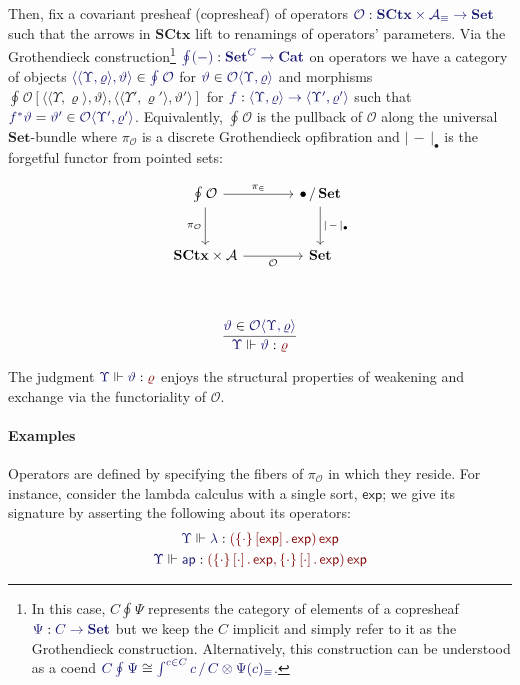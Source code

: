 \documentclass[11pt]{article}
\theoremstyle{definition}
\theoremstyle{remark}
\numberwithin{equation}{section}
\def\IModeColorName{MidnightBlue}
\def\OModeColorName{Maroon}
\newcommand\IMode[1]{{\color{\IModeColorName}{#1}}}
\newcommand\OMode[1]{{\color{\OModeColorName}{#1}}}
\newcommand\Member[2]{\IMode{#1}\in\IMode{#2}}
\newcommand\EqMember[3]{\IMode{#1}=\IMode{#2}\in\IMode{#3}}
\newcommand\Of[2]{\IMode{#1} : \IMode{#2}}
\newcommand\MkValence[3]{\left\{#1\right\}\left[#2\right].\, #3}
\newcommand\MkArity[2]{\left(#1\right) #2}
\newcommand\Arities{\mathcal{A}}
\newcommand\Operators{\mathcal{O}}
\newcommand\Cats{\mathbf{Cat}}
\newcommand\Discrete[1]{#1_{\equiv}}
\newcommand\Sets{\mathbf{Set}}
\newcommand\SCtx{\mathbf{SCtx}}
\newcommand\IsOperator[3]{\IMode{#1}\Vdash \IMode{#2} : \OMode{#3}}
\newcommand\Grothendieck[2]{\oint^{#1} #2#1}
\newcommand\Pair[2]{\langle #1, #2 \rangle}
\newcommand\Restriction[1]{#1^{*}}
\newcommand\Singleton{\bullet}
\newcommand\Forget[1]{|\, #1\, |}
\newcommand\Coslice[2]{#1\, /\, #2}
\newcommand\SortExp{\mathsf{exp}}
\newcommand\Hom[3]{#1\left[#2,#3\right]}
\begin{document}
Then, fix a covariant presheaf (copresheaf) of operators
$\Of{\Operators}{\SCtx\times\Discrete{\Arities}\to\Sets}$ such that the arrows
in $\SCtx$ lift to renamings of operators' parameters. Via the Grothendieck
construction\footnote{In this case, $C\Grothendieck{}{\Psi}$ represents the
  category of elements of a copresheaf $\Of{\Psi}{C\to\Sets}$ but we keep the
  $C$ implicit and simply refer to it as the Grothendieck construction.
  Alternatively, this construction can be understood as a coend
$\IMode{C\Grothendieck{}{\Psi}}\cong \IMode{\int^{c \in C}\Coslice{c}{C}
\otimes \Discrete{\Psi(c)}}$.} $\Of{\Grothendieck{}{(-)}}{\Sets^{C}\to\Cats}$
on operators we have a category of objects
$\Member{\Pair{\Pair{\Upsilon}{\varrho}}{\vartheta}}{\Grothendieck{}{\Operators}}$
for $\Member{\vartheta}{\Operators\Pair{\Upsilon}{\varrho}}$ and morphisms
$\Hom{\Grothendieck{}{\Operators}}{\Pair{\Pair{\Upsilon}{\varrho}}{\vartheta}}{\Pair{\Pair{\Upsilon'}{\varrho'}}{\vartheta'}}$
for $\Of{f}{\Pair{\Upsilon}{\varrho}\to\Pair{\Upsilon'}{\varrho'}}$ such that
$\EqMember{\Restriction{f}\vartheta}{\vartheta'}{\Operators\Pair{\Upsilon'}{\varrho'}}$.
Equivalently, $\Grothendieck{}{\Operators}$ is the pullback of $\Operators$
along the universal $\Sets$-bundle where $\pi_{\Operators}$ is a discrete
Grothendieck opfibration and $\Forget{-}_{\Singleton}$ is the forgetful functor
from pointed sets:

\[
\begin{tikzcd}[ampersand replacement = \&, sep = large]
  {\Grothendieck{}{\Operators}}
    \arrow[r, "{\pi_{\in}}"]
    \arrow[d, "{\pi_{\Operators}}" left]
  \& {\Coslice{\Singleton}{\Sets}}
    \arrow[d, "{\Forget{-}_{\Singleton}}"] \\
  {\SCtx\times\Arities}
     \arrow[r, "{\Operators}" below]
  \& {\Sets} \\
\end{tikzcd}
\]

\[
  \infer{
    \IsOperator{\Upsilon}{\vartheta}{\varrho}
  }{
    \Member{\vartheta}{\Operators\langle\Upsilon,\varrho\rangle}
  }
\]

The judgment $\IsOperator{\Upsilon}{\vartheta}{\varrho}$ enjoys the structural
properties of weakening and exchange via the functoriality of
$\Operators$.

\paragraph{Examples}

Operators are defined by specifying the fibers of $\pi_{\Operators}$ in which
they reside. For instance, consider the lambda calculus with a single sort,
$\SortExp$; we give its signature by asserting the following about its
operators:
\begin{gather*}
  \IsOperator{\Upsilon}{\lambda}{
    \MkArity{\MkValence{\cdot}{\SortExp}{\SortExp}}{\SortExp}
  }\\
  \IsOperator{\Upsilon}{\mathsf{ap}}{
    \MkArity{
      \MkValence{\cdot}{\cdot}{\SortExp},
      \MkValence{\cdot}{\cdot}{\SortExp}
    }{\SortExp}
  }
\end{gather*}
\end{document}

